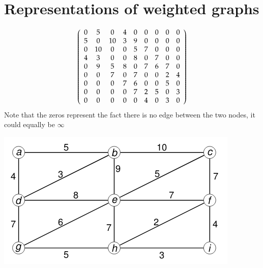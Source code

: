 \documentclass{article}[18pt]
\begin{document}
\section{Representations of weighted graphs}
$$\left( \begin{array} { c c c c c c c c c } { 0 } & { 5 } & { 0 } & { 4 } & { 0 } & { 0 } & { 0 } & { 0 } & { 0 } \\ { 5 } & { 0 } & { 10 } & { 3 } & { 9 } & { 0 } & { 0 } & { 0 } & { 0 } \\ { 0 } & { 10 } & { 0 } & { 0 } & { 5 } & { 7 } & { 0 } & { 0 } & { 0 } \\ { 4 } & { 3 } & { 0 } & { 0 } & { 8 } & { 0 } & { 7 } & { 0 } & { 0 } \\ { 0 } & { 9 } & { 5 } & { 8 } & { 0 } & { 7 } & { 6 } & { 7 } & { 0 } \\ { 0 } & { 0 } & { 7 } & { 0 } & { 7 } & { 0 } & { 0 } & { 2 } & { 4 } \\ { 0 } & { 0 } & { 0 } & { 7 } & { 6 } & { 0 } & { 0 } & { 5 } & { 0 } \\ { 0 } & { 0 } & { 0 } & { 0 } & { 7 } & { 2 } & { 5 } & { 0 } & { 3 } \\ { 0 } & { 0 } & { 0 } & { 0 } & { 0 } & { 4 } & { 0 } & { 3 } & { 0 } \end{array} \right)$$
Note that the zeros represent the fact there is no edge between the two nodes, it could equally be $\infty$
\begin{center}
	\includegraphics[scale=0.7]{graph2}
\end{center}
\end{document}
